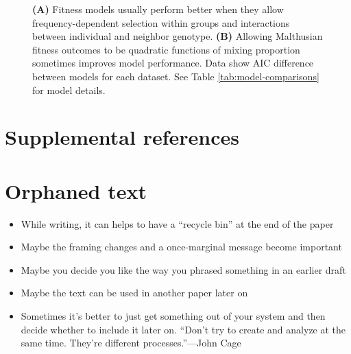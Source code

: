\documentclass[11pt]{article}
\begin{document}
\begin{figure}[p]
\caption{\textbf{(A)} Fitness models usually perform better when they allow frequency-dependent selection within groups and interactions between individual and neighbor genotype. \textbf{(B)} Allowing Malthusian fitness outcomes to be quadratic functions of mixing proportion sometimes improves model performance. Data show AIC difference between models for each dataset. 
See Table \ref{tab:model-comparisons} for model details.}
\label{fig:nonadditivity-components}
\end{figure}

% 
% 
\section{Supplemental references}
\label{sec:supplemental-references}


% 
% 
\clearpage
\pagestyle{empty}
\section{Orphaned text}

\begin{itemize}
	\item While writing, it can helps to have a ``recycle bin'' at the end of the paper
	\item Maybe the framing changes and a once-marginal message become important
	\item Maybe you decide you like the way you phrased something in an earlier draft
	\item Maybe the text can be used in another paper later on
	\item Sometimes it's better to just get something out of your system and then decide whether to include it later on. ``Don't try to create and analyze at the same time. They're different processes.''---John Cage 
\end{itemize}
\end{document}
